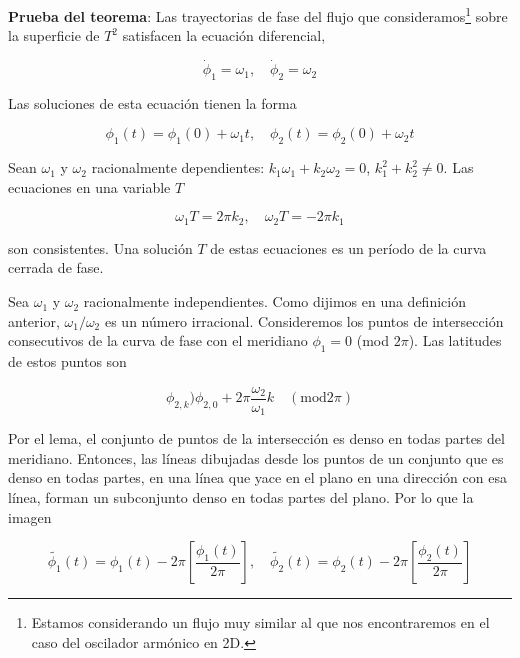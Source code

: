 \documentclass[a4paper,10pt]{article}
\numberwithin{equation}{section}
\begin{document}
\vspace{.3cm}

\textbf{Prueba del teorema}: Las trayectorias de fase del flujo que consideramos\footnote{Estamos considerando
un flujo muy similar al que nos encontraremos en el caso del oscilador armónico en 2D.}
sobre la superficie de $T^2$ satisfacen la ecuación diferencial,

\begin{equation}
 \dot{\phi}_1 = \omega_1, \quad \dot{\phi}_2 = \omega_2
\end{equation}

Las soluciones de esta ecuación tienen la forma

\begin{equation}
 \phi_1 (t) = \phi_1 (0) + \omega_1 t, \quad \phi_2 (t) = \phi_2 (0) + \omega_2 t
\end{equation}

Sean $\omega_1$ y $\omega_2$ racionalmente dependientes: $k_1\omega_1 + k_2 \omega_2 = 0$,
$k_1^2+k_2^2 \ne 0$. Las ecuaciones en una variable $T$ 

\begin{equation}
 \omega_1 T = 2 \pi k_2, \quad \omega_2 T = - 2 \pi k_1
\end{equation}

son consistentes. Una solución $T$ de estas ecuaciones es un período de la curva 
cerrada de fase.

\vspace{.3cm}

Sea $\omega_1$ y $\omega_2$ racionalmente independientes. Como dijimos en una definición 
anterior, $\omega_1/\omega_2$ es un número irracional. Consideremos los puntos de 
intersección consecutivos de la curva de fase con el meridiano $\phi_1=0$ (mod $2\pi$). 
Las latitudes de estos puntos son

\begin{equation}
 \phi_{2,k} ) \phi_{2,0} + 2\pi \frac{\omega_2}{\omega_1}k \quad (\text{mod} 2\pi)
\end{equation}

Por el lema, el conjunto de puntos de la intersección es denso en todas partes del 
meridiano. Entonces, las líneas dibujadas desde los puntos de un conjunto que es 
denso en todas partes, en una línea que yace en el plano en una dirección con 
esa línea, forman un subconjunto denso en todas partes del plano. Por lo que la imagen

\begin{equation}
 \tilde{\phi_1}(t) = \phi_1 (t) - 2\pi \left[\frac{\phi_1(t)}{2\pi} \right], \quad
  \tilde{\phi_2}(t) = \phi_2 (t) - 2\pi \left[\frac{\phi_2(t)}{2\pi} \right]
\end{equation}
\end{document}
